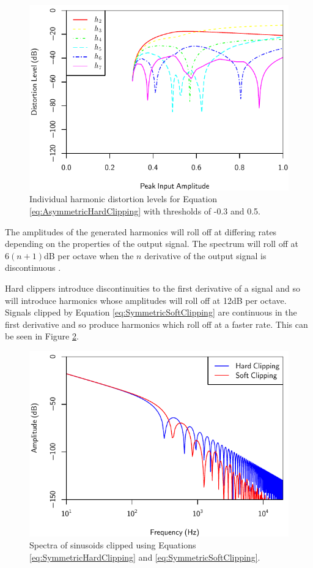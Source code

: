 			\begin{figure}[h!]
				\centering
				\includegraphics{chapter5/Images/AsymmetricHardClippingHarmonics.pdf}
				\caption{Individual harmonic distortion levels for Equation
					 \ref{eq:AsymmetricHardClipping} with thresholds of -0.3 and 0.5.}
				\label{fig:AsymmetricHardClippingHarmonics}
			\end{figure}

			The amplitudes of the generated harmonics will roll off at differing rates depending on the
			properties of the output signal. The spectrum will roll off at $6(n+1)$dB per octave when
			the $n$ derivative of the output signal is discontinuous \citep{kraght2000aliasing}.

			Hard clippers introduce discontinuities to the first derivative of a signal and so will introduce
			harmonics whose amplitudes will roll off at 12dB per octave. Signals clipped by Equation
			\ref{eq:SymmetricSoftClipping} are continuous in the first derivative and so produce harmonics
			which roll off at a faster rate. This can be seen in Figure \ref{fig:ClippingSpectra}.

			\begin{figure}[h!]
				\centering
				\includegraphics{chapter5/Images/ClippingSpectra.pdf}
				\caption{Spectra of sinusoids clipped using Equations \ref{eq:SymmetricHardClipping} and
			                 \ref{eq:SymmetricSoftClipping}.}
				\label{fig:ClippingSpectra}
			\end{figure}

